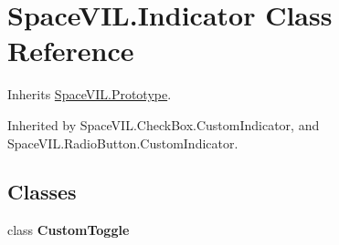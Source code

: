 \hypertarget{class_space_v_i_l_1_1_indicator}{}\section{Space\+V\+I\+L.\+Indicator Class Reference}
\label{class_space_v_i_l_1_1_indicator}


Inherits \mbox{\hyperlink{class_space_v_i_l_1_1_prototype}{Space\+V\+I\+L.\+Prototype}}.



Inherited by Space\+V\+I\+L.\+Check\+Box.\+Custom\+Indicator, and Space\+V\+I\+L.\+Radio\+Button.\+Custom\+Indicator.

\subsection*{Classes}
\begin{DoxyCompactItemize}
\item 
class {\bfseries Custom\+Toggle}
\end{DoxyCompactItemize}
